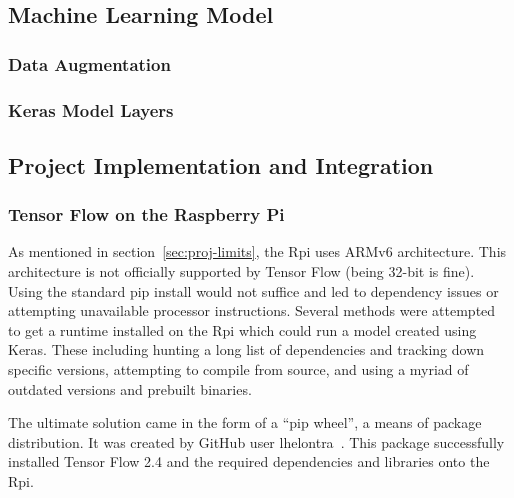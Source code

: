 \documentclass[11pt]{article}
\begin{document}
        \subsection{Machine Learning Model}\label{sec:ml}
            \subsubsection{Data Augmentation} %

            \subsubsection{Keras Model Layers}

        \subsection{Project Implementation and Integration}
            \subsubsection{Tensor Flow on the Raspberry Pi}
                As mentioned in section~\ref{sec:proj-limits}, the Rpi uses ARMv6 architecture. This architecture is not officially supported by Tensor Flow (being 32-bit is fine). Using the standard pip install would not suffice and led to dependency issues or attempting unavailable processor instructions. Several methods were attempted to get a runtime installed on the Rpi which could run a model created using Keras. These including hunting a long list of dependencies and tracking down specific versions, attempting to compile from source, and using a myriad of outdated versions and prebuilt binaries. 
                
                The ultimate solution came in the form of a ``pip wheel'', a means of package distribution. It was created by GitHub user lhelontra~\cite{lontra}. This package successfully installed Tensor Flow 2.4 and the required dependencies and libraries onto the Rpi.
\end{document}
